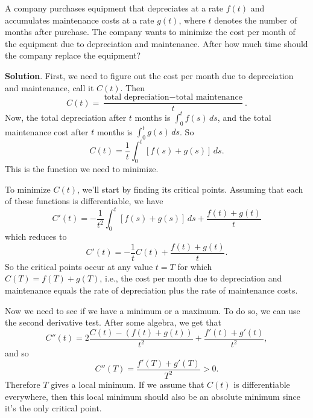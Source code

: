 \documentclass[10pt,]{book}
\theoremstyle{ptxplainnotitle}
\theoremstyle{ptxplaintitle}
\theoremstyle{ptxplainnotitle}
\theoremstyle{ptxplaintitle}
\theoremstyle{ptxplainnotitle}
\theoremstyle{ptxplaintitle}
\theoremstyle{ptxdefinitionnotitle}
\theoremstyle{ptxdefinitiontitle}
\theoremstyle{ptxdefinitionnotitle}
\theoremstyle{ptxdefinitiontitle}
\theoremstyle{ptxdefinitionnotitle}
\theoremstyle{ptxdefinitiontitle}
\theoremstyle{ptxdefinitionnotitle}
\theoremstyle{ptxdefinitiontitle}
\theoremstyle{ptxdefinitionnotitle}
\theoremstyle{ptxdefinitiontitle}
\numberwithin{equation}{section}
\begin{document}
\begin{example}\label{example-a-business-problem}
\hypertarget{p-473}{}%
A company purchases equipment that depreciates at a rate \(f(t)\) and accumulates maintenance costs at a rate \(g(t)\), where \(t\) denotes the number of months after purchase. The company wants to minimize the cost per month of the equipment due to depreciation and maintenance. After how much time should the company replace the equipment?%
\par\smallskip%
\noindent\textbf{Solution}.\hypertarget{solution-104}{}\quad%
\hypertarget{p-474}{}%
First, we need to figure out the cost per month due to depreciation and maintenance, call it \(C(t)\). Then%
\begin{equation*}
C(t) = \frac{\text{total depreciation} - \text{total maintenance}}{t}.
\end{equation*}
Now, the total depreciation after \(t\) months is \(\int_{0}^{t}f(s)\,ds\), and the total maintenance cost after \(t\) months is \(\int_{0}^{t}g(s)\,ds\). So%
\begin{equation*}
C(t) = \frac{1}{t}\int_{0}^{t}[f(s) + g(s)]\,ds.
\end{equation*}
This is the function we need to minimize.%
\par
\hypertarget{p-475}{}%
To minimize \(C(t)\), we'll start by finding its critical points. Assuming that each of these functions is differentiable, we have%
\begin{equation*}
C'(t) = -\frac{1}{t^{2}}\int_{0}^{t}[f(s)+g(s)]\,ds + \frac{f(t) + g(t)}{t}
\end{equation*}
which reduces to%
\begin{equation*}
C'(t) = -\frac{1}{t}C(t) + \frac{f(t) + g(t)}{t}.
\end{equation*}
So the critical points occur at any value \(t = T\) for which \(C(T) = f(T) + g(T)\), i.e., the cost per month due to depreciation and maintenance equals the rate of depreciation plus the rate of maintenance costs.%
\par
\hypertarget{p-476}{}%
Now we need to see if we have a minimum or a maximum. To do so, we can use the second derivative test. After some algebra, we get that%
\begin{equation*}
C''(t) = 2\frac{C(t) - (f(t) + g(t))}{t^{2}} + \frac{f'(t) + g'(t)}{t^{2}},
\end{equation*}
and so%
\begin{equation*}
C''(T) = \frac{f'(T) + g'(T)}{T^{2}} >0.
\end{equation*}
Therefore \(T\) gives a local minimum. If we assume that \(C(t)\) is differentiable everywhere, then this local minimum should also be an absolute minimum since it's the only critical point.%
\end{example}
\typeout{************************************************}
\typeout{************************************************}
\end{document}
